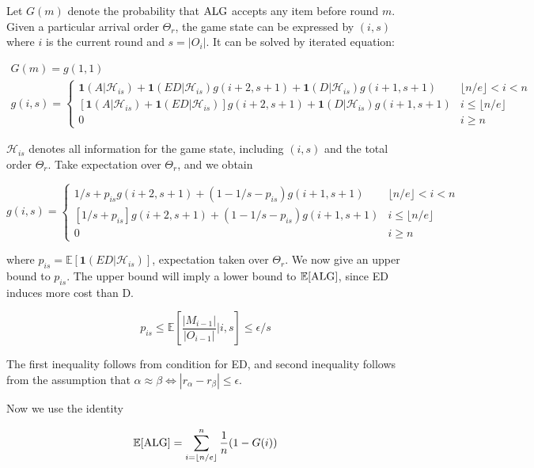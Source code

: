 \documentclass{article}
\newcommand{\expec}{\mathbb{E}}
\begin{document}
Let $G(m)$ denote the probability that $\text{ALG}$ accepts any item before round $m$. Given a particular arrival order $\Theta_r$, the game state can be expressed by $(i,s)$ where $i$ is the current round and $s = |O_i|$. It can be solved by iterated equation:

\begin{gather*}
G(m) = g(1, 1)\\
g(i,s) = \begin{cases}
\mathbf{1}(A|\mathcal{H}_{is}) + 
\mathbf{1}(ED|\mathcal{H}_{is})g(i+2, s+1) + 
\mathbf{1}(D|\mathcal{H}_{is})g(i+1,s+1) & \lfloor n/e \rfloor<i<n\\
[\mathbf{1}(A|\mathcal{H}_{is}) + 
\mathbf{1}(ED|\mathcal{H}_{is})]g(i+2, s+1) + 
\mathbf{1}(D|\mathcal{H}_{is})g(i+1,s+1) & i\leq\lfloor n/e \rfloor\\
0 & i \geq n
\end{cases}
\end{gather*}

$\mathcal{H}_{is}$ denotes all information for the game state, including $(i,s)$ and the total order $\Theta_r$.
Take expectation over $\Theta_r$, and we obtain

\begin{equation*}
g(i,s) = \begin{cases}
1/s + 
p_{is}g(i+2, s+1) + 
(1-1/s-p_{is})g(i+1,s+1) & \lfloor n/e \rfloor<i<n\\
[1/s + 
p_{is}]g(i+2, s+1) + 
(1-1/s-p_{is})g(i+1,s+1) & i\leq\lfloor n/e \rfloor\\
0 & i \geq n
\end{cases}
\end{equation*}

where $p_{is} = \expec[\mathbf{1}(ED|\mathcal{H}_{is})]$, expectation taken over $\Theta_r$. We now give an upper bound to $p_{is}$. The upper bound will imply a lower bound to $\expec[\ALG]$, since ED induces more cost than D.

\begin{equation*}
p_{is} \leq \expec\left[\frac{|M_{i-1}|}{|O_{i-1}| }| i,s\right] \leq \epsilon/s
\end{equation*}

The first inequality follows from condition for ED, and second inequality follows from the assumption that $\alpha \approx \beta \iff |r_\alpha - r_\beta|\leq \epsilon$.

Now we use the identity

\begin{equation*}
\expec[\ALG] = \sum_{i=\lfloor n/e \rfloor}^n \frac{1}{n} (1-G(i))
\end{equation*}
\end{document}
